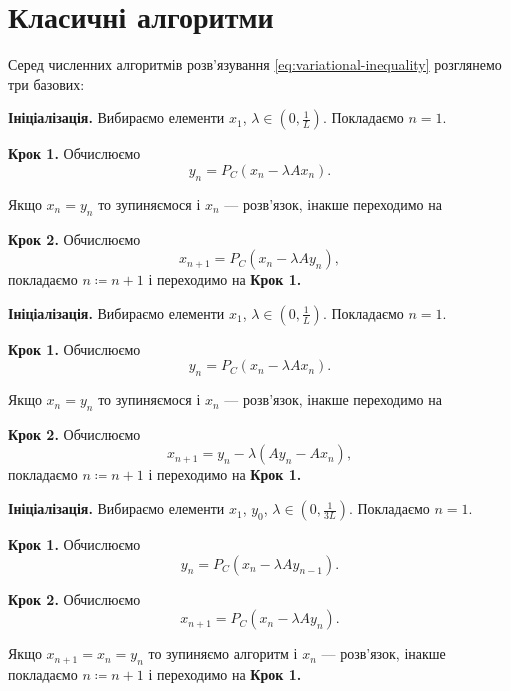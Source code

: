 \section{Класичні алгоритми}

Серед численних алгоритмів розв'язування \eqref{eq:variational-inequality} розглянемо три базових:

\begin{algorithm}[Корпелевич]
    \label{algo:korpelevich}
    \textbf{Ініціалізація.} Вибираємо елементи $x_1$, $\lambda \in \left( 0, \frac{1}{L} \right)$. Покладаємо $n = 1$. \medskip

    \textbf{Крок 1.} Обчислюємо
    \begin{equation}
        y_n = P_C (x_n - \lambda A x_n).
    \end{equation}
    
    Якщо $x_n = y_n$ то зупиняємося і $x_n$ --- розв'язок, інакше переходимо на \medskip
    
    \textbf{Крок 2.} Обчислюємо
    \begin{equation}
        x_{n + 1} = P_C (x_n - \lambda A y_n),
    \end{equation}
    покладаємо $n \coloneqq n + 1$ і переходимо на \textbf{Крок 1.}
\end{algorithm}

\begin{algorithm}[P. Tseng]
    \label{algo:tseng}
    \textbf{Ініціалізація.} Вибираємо елементи $x_1$, $\lambda \in \left( 0, \frac{1}{L} \right)$. Покладаємо $n = 1$. \medskip

    \textbf{Крок 1.} Обчислюємо
    \begin{equation}
        y_n = P_C (x_n - \lambda A x_n).
    \end{equation}
    
    Якщо $x_n = y_n$ то зупиняємося і $x_n$ --- розв'язок, інакше переходимо на \medskip
    
    \textbf{Крок 2.} Обчислюємо
    \begin{equation}
        x_{n + 1} = y_n - \lambda (A y_n - A x_n),
    \end{equation}
    покладаємо $n \coloneqq n + 1$ і переходимо на \textbf{Крок 1.}
\end{algorithm}

\begin{algorithm}[Попов]
    \label{algo:popov}
    \textbf{Ініціалізація.} Вибираємо елементи $x_1$, $y_0$, $\lambda \in \left( 0, \frac{1}{3L} \right)$. Покладаємо $n = 1$. \medskip

    \textbf{Крок 1.} Обчислюємо
    \begin{equation}
        y_n = P_C (x_n - \lambda A y_{n - 1}).
    \end{equation}
    
    \textbf{Крок 2.} Обчислюємо
    \begin{equation}
        x_{n + 1} = P_C (x_n - \lambda A y_n).
    \end{equation}
    
    Якщо $x_{n + 1} = x_n = y_n$ то зупиняємо алгоритм і $x_n$ --- розв'язок, інакше покладаємо $n \coloneqq n + 1$ і переходимо на \textbf{Крок 1.}
\end{algorithm}

